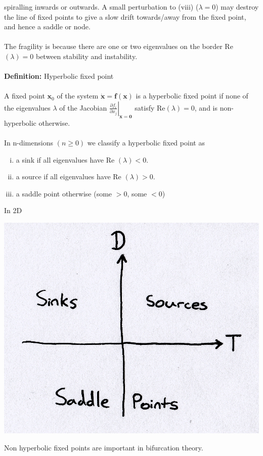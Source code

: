 \documentclass{article}
\begin{document}
spiralling inwards or outwards. A small perturbation to (viii) ($\lambda = 0$) 
may destroy the line of fixed points to give a slow drift towards/away from the
fixed point, and hence a saddle or node.
\\
\\
The fragility is because there are one or two eigenvalues on the border
Re$(\lambda) = 0$ between stability and instability.
\\
\\
\textbf{Definition:} Hyperbolic fixed point
\\
\\
A fixed point $\bm{x}_0$ of the system $\dot{\bm{x}} = \bm{f}(\bm{x})$ is a
hyperbolic fixed point if none of the eigenvalues $\lambda$ of the Jacobian
$ \left. \frac{\partial f_i}{\partial x_j} \right| _{\bm{x} = \bm{0}} $ satisfy
Re$(\lambda) = 0$, and is non-hyperbolic otherwise.
\\
\\
In n-dimensions $(n \geq 0)$ we classify a hyperbolic fixed point as
\begin{enumerate}[(i)]
\item a sink if all eigenvalues have Re $(\lambda) < 0$.
\item a source if all eigenvalues have Re $(\lambda) > 0$.
\item a saddle point otherwise (some $>0$, some $<0$)
\end{enumerate}
In 2D
\begin{center}
\includegraphics[scale = 0.15]{Diagram2.png}
\end{center}
Non hyperbolic fixed points are important in bifurcation theory.
\\
\end{document}
